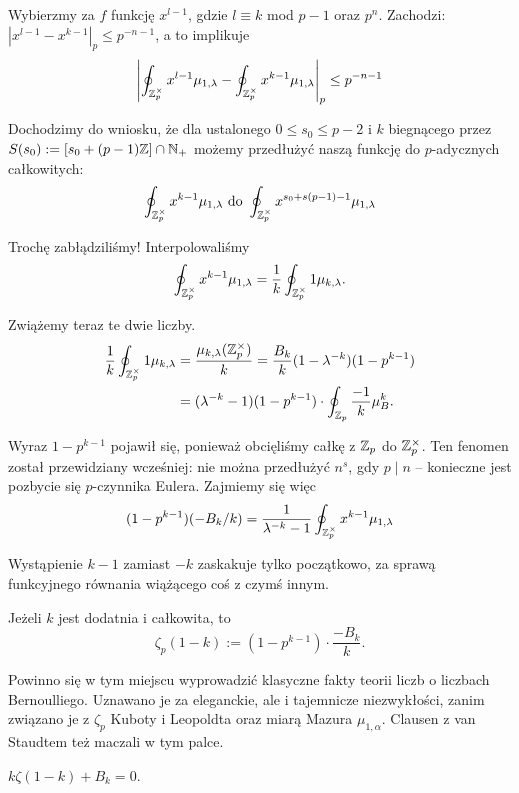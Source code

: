 Wybierzmy za $f$ funkcję $x^{l-1}$, gdzie $l \equiv k$ mod $p-1$ oraz $p^n$.
Zachodzi: $|x^{l - 1} - x^{k - 1}|_p \le  p^{-n-1}$, a to implikuje
\[
	\left|\oint_{\mathbb Z_p^\times} x^{l- 1} \mu_{1, \lambda} - \oint_{\mathbb Z_p^\times} x^{k - 1} \mu_{1, \lambda} \right|_p \le p^{-n-1}
\]

Dochodzimy do wniosku, że dla ustalonego $0 \le s_0 \le p -2$ i $k$ biegnącego przez $S(s_0) := [s_0 + (p - 1) \mathbb Z] \cap \mathbb N_+$ możemy przedłużyć naszą funkcję do $p$-adycznych całkowitych:
\[
	\oint_{\mathbb Z_p^\times} x^{k-1} \mu_{1, \lambda} \textrm{ do } \oint_{\mathbb Z_p^\times} x^{s_0 + s(p-1) - 1} \mu_{1, \lambda}
\]

Trochę zabłądziliśmy!
Interpolowaliśmy
\[
	\oint_{\mathbb Z_p^\times} x^{k-1} \mu_{1, \lambda} = \frac 1 k \oint_{\mathbb Z_p^\times} 1 \mu_{k, \lambda}.
\]

Zwiążemy teraz te dwie liczby.
\begin{align*}
\frac 1 k \oint_{\mathbb Z_p^\times} 1 \mu_{k, \lambda} & = \frac {\mu_{k, \lambda} (\mathbb Z_p^\times)}{k} = \frac{B_k}{k} (1 - \lambda^{-k})(1 - p^{k-1}) \\
& = (\lambda^{-k} - 1) (1 - p^{k - 1}) \cdot \oint_{\mathbb Z_p} \frac{-1}{k} \mu_B^k.
\end{align*}

Wyraz $1 - p^{k-1}$ pojawił się, ponieważ obcięliśmy całkę z $\mathbb Z_p$ do $\mathbb Z_p^\times$.
Ten fenomen został przewidziany wcześniej: nie można przedłużyć $n^s$, gdy $p \mid n$ -- konieczne jest pozbycie się $p$-czynnika Eulera.
Zajmiemy się więc
\[
	(1 - p^{k-1})(-B_k / k) = \frac{1}{\lambda^{-k} - 1} \oint_{\mathbb Z_p^\times} x^{k-1} \mu_{1, \lambda}
\]

Wystąpienie $k - 1$ zamiast $-k$ zaskakuje tylko początkowo, za sprawą funkcyjnego równania wiążącego coś z czymś innym.

\begin{definicja}
	Jeżeli $k$ jest dodatnia i całkowita, to
	\[
		\zeta_p(1 - k) := (1 - p^{k - 1}) \cdot \frac{-B_k}{k}.
	\]
\end{definicja}

Powinno się w tym miejscu wyprowadzić klasyczne fakty teorii liczb o liczbach Bernoulliego.
Uznawano je za eleganckie, ale i tajemnicze niezwykłości, zanim związano je z $\zeta_p$ Kuboty i Leopoldta oraz miarą Mazura $\mu_{1, \alpha}$.
Clausen z van Staudtem też maczali w tym palce.

\begin{fakt}
	$k \zeta(1-k) + B_k = 0$.
\end{fakt}

